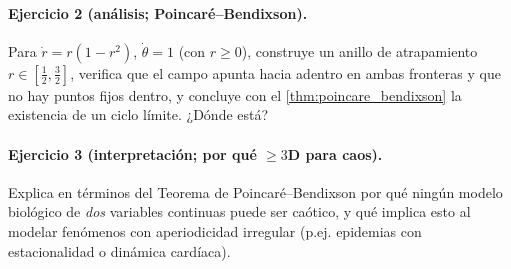 \paragraph{Ejercicio 2 (análisis; Poincaré--Bendixson).} Para $\dot{r}=r(1-r^2)$, $\dot{\theta}=1$ (con $r\ge 0$), construye un anillo de atrapamiento $r\in[\tfrac12,\tfrac32]$, verifica que el campo apunta hacia adentro en ambas fronteras y que no hay puntos fijos dentro, y concluye con el \cref{thm:poincare_bendixson} la existencia de un ciclo límite. ¿Dónde está?

\paragraph{Ejercicio 3 (interpretación; por qué $\geq 3$D para caos).} Explica en términos del Teorema de Poincaré--Bendixson por qué ningún modelo biológico de \emph{dos} variables continuas puede ser caótico, y qué implica esto al modelar fenómenos con aperiodicidad irregular (p.ej. epidemias con estacionalidad o dinámica cardíaca).
